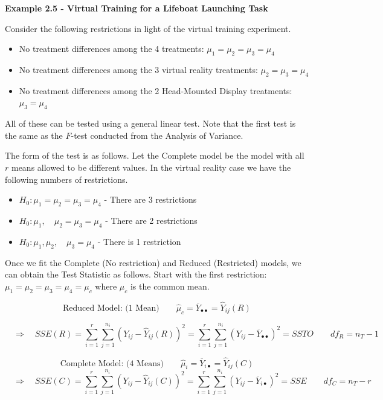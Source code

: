 \documentclass[
]{book}
\providecommand{\tightlist}{%
  \setlength{\itemsep}{0pt}\setlength{\parskip}{0pt}}
\begin{document}
\textbf{Example 2.5 - Virtual Training for a Lifeboat Launching Task}

Consider the following restrictions in light of the virtual training
experiment.

\begin{itemize}
\tightlist
\item
  No treatment differences among the 4 treatments:
  \(\mu_1=\mu_2=\mu_3=\mu_4\)
\item
  No treatment differences among the 3 virtual reality treatments:
  \(\mu_2=\mu_3=\mu_4\)
\item
  No treatment differences among the 2 Head-Mounted Display treatments:
  \(\mu_3=\mu_4\)
\end{itemize}

All of these can be tested using a general linear test. Note that the
first test is the same as the \(F\)-test conducted from the Analysis of
Variance.

The form of the test is as follows. Let the Complete model be the model
with all \(r\) means allowed to be different values. In the virtual
reality case we have the following numbers of restrictions.

\begin{itemize}
\tightlist
\item
  \(H_0:\mu_1=\mu_2=\mu_3=\mu_4\) - There are 3 restrictions
\item
  \(H_0:\mu_1, \quad \mu_2=\mu_3=\mu_4\) - There are 2 restrictions
\item
  \(H_0:\mu_1, \mu_2, \quad \mu_3=\mu_4\) - There is 1 restriction
\end{itemize}

Once we fit the Complete (No restriction) and Reduced (Restricted)
models, we can obtain the Test Statistic as follows. Start with the
first restriction: \(\mu_1=\mu_2=\mu_3=\mu_4=\mu_c\) where \(\mu_c\) is
the common mean.

\[
\mbox{Reduced Model: (1 Mean)} \qquad \hat{\mu}_c = \overline{Y}_{\bullet\bullet} = \hat{Y}_{ij}(R)
\]

\[
  \quad \Rightarrow \quad SSE(R)=\sum_{i=1}^r\sum_{j=1}^{n_i}\left(Y_{ij}-\hat{Y}_{ij}(R)\right)^2
  = \sum_{i=1}^r\sum_{j=1}^{n_i}\left(Y_{ij}-\overline{Y}_{\bullet\bullet}\right)^2 = SSTO
  \qquad df_R = n_T-1
  \]

\[
\mbox{Complete Model: (4 Means)} \qquad \hat{\mu}_i = \overline{Y}_{i\bullet}=\hat{Y}_{ij}(C)
  \] \[
  \quad \Rightarrow \quad SSE(C)=\sum_{i=1}^r\sum_{j=1}^{n_i}\left(Y_{ij}-\hat{Y}_{ij}(C)\right)^2
  = \sum_{i=1}^r\sum_{j=1}^{n_i}\left(Y_{ij}-\overline{Y}_{i\bullet}\right)^2 = SSE
  \qquad df_C = n_T-r
  \]
\end{document}
